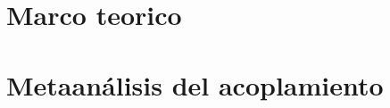 \documentclass[letterpaper,12pt]{book}
\begin{document}
\frontmatter
    
    \tableofcontents
    

\mainmatter
    \chapter{Marco teorico}
        
        
        
        
    \chapter{Metaanálisis del acoplamiento}
        




\backmatter
    \nocite{*}
    \printbibliography
\end{document}
